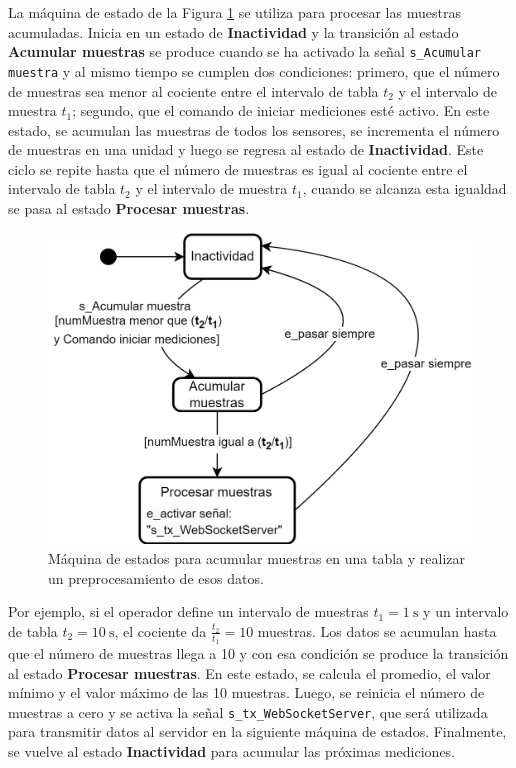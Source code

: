 La máquina de estado de la Figura \ref{fig:sc_processing} se utiliza para procesar las muestras acumuladas. Inicia en un estado de \textbf{Inactividad} y la transición al estado \textbf{Acumular muestras} se produce cuando se ha activado la señal \texttt{s\_Acumular muestra}  y al mismo tiempo se cumplen dos condiciones: primero, que el número de muestras sea menor al cociente entre el intervalo de tabla $t_{2}$ y el intervalo de muestra $t_{1}$; segundo, que el comando de iniciar mediciones esté activo. En este estado, se acumulan las muestras de todos los sensores, se incrementa el número de muestras en una unidad y luego se regresa al estado de \textbf{Inactividad}. Este ciclo se repite hasta que el número de muestras es igual al cociente entre el intervalo de tabla $t_{2}$ y el intervalo de muestra $t_{1}$, cuando se alcanza esta igualdad se pasa al estado \textbf{Procesar muestras}. 


\begin{figure}[H]
    \centering
    \includegraphics[width=0.65\linewidth]{Figuras/datalogger/Firmware/sc_processing.png}
    \caption{Máquina de estados para acumular muestras en una tabla y realizar un preprocesamiento de esos datos.}
    \label{fig:sc_processing}
\end{figure}

Por ejemplo, si el operador define un intervalo de muestras $t_{1} = \SI{1}{\second}$ y un intervalo de tabla $t_{2} = \SI{10}{\second}$, el cociente da $\frac{t_{2}}{t_{1}}=10$ muestras. Los datos se acumulan hasta que el número de muestras llega a 10 y con esa condición se produce la transición al estado \textbf{Procesar muestras}. En este estado, se calcula el promedio, el valor mínimo y el valor máximo de las 10 muestras. Luego, se reinicia el número de muestras a cero y se activa la señal \texttt{s\_tx\_WebSocketServer}, que será utilizada para transmitir datos al servidor en la siguiente máquina de estados. Finalmente, se vuelve al estado \textbf{Inactividad} para acumular las próximas mediciones.
